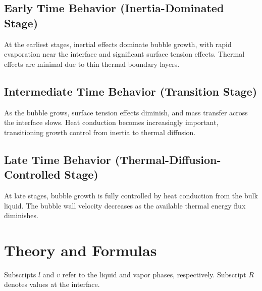 \documentclass[aps,pre,twocolumn,superscriptaddress,floatfix]{revtex4-2}
\begin{document}
\subsection{Early Time Behavior (Inertia-Dominated Stage)}
At the earliest stages, inertial effects dominate bubble growth, with rapid evaporation near the interface and significant surface tension effects. Thermal effects are minimal due to thin thermal boundary layers.

\subsection{Intermediate Time Behavior (Transition Stage)}
As the bubble grows, surface tension effects diminish, and mass transfer across the interface slows. Heat conduction becomes increasingly important, transitioning growth control from inertia to thermal diffusion.

\subsection{Late Time Behavior (Thermal-Diffusion-Controlled Stage)}
At late stages, bubble growth is fully controlled by heat conduction from the bulk liquid. The bubble wall velocity decreases as the available thermal energy flux diminishes.

\section{Theory and Formulas}

Subscripts $l$ and $v$ refer to the liquid and vapor phases, respectively. Subscript $R$ denotes values at the interface.
\end{document}

